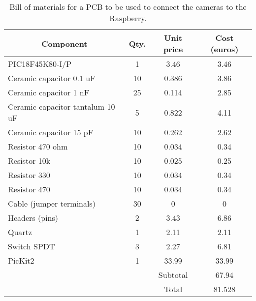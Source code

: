 \begin{table}
\begin{center}
\begin{tabular}{| l | c | c | c |}
\hline
\multicolumn{1}{|c|}{Component}	 & 	\multicolumn{1}{c|}{Qty.}	 & 	\multicolumn{1}{c|}{Unit price} & 	\multicolumn{1}{c|}{Cost (euros)}\\ \hline
PIC18F45K80-I/P	 & 	1	 & 	3.46	 & 	3.46\\ \hline
Ceramic capacitor 0.1 uF	 & 	10	 & 	0.386	 & 	3.86\\ \hline
Ceramic capacitor 1 nF	 & 	25	 & 	0.114	 & 	2.85\\ \hline
Ceramic capacitor tantalum 10 uF	 & 	5	 & 	0.822	 & 	4.11\\ \hline
Ceramic capacitor 15 pF	 & 	10	 & 	0.262	 & 	2.62\\ \hline
Resistor 470 ohm	 & 	10	 & 	0.034	 & 	0.34\\ \hline
Resistor 10k	 & 	10	 & 	0.025	 & 	0.25\\ \hline
Resistor 330	 & 	10	 & 	0.034	 & 	0.34\\ \hline
Resistor 470	 & 	10	 & 	0.034	 & 	0.34\\ \hline
Cable (jumper terminals)	 & 	30	 & 	0	 & 	0\\ \hline
Headers (pins)	 & 	2	 & 	3.43	 & 	6.86\\ \hline
Quartz	 & 	1	 & 	2.11	 & 	2.11\\ \hline
Switch SPDT	 & 	3	 & 	2.27	 & 	6.81\\ \hline
PicKit2	 & 	1	 & 	33.99	 & 	33.99\\ \hline
\multicolumn{2}{c|}{}	 & 	Subtotal	 & 	67.94\\ \cline{3-4}
\multicolumn{2}{c|}{}	& 	Total	 & 	81.528\\ \cline{3-4}
  \end{tabular}
\caption[Bill of materials for a PCB.]{Bill of materials for a PCB to be used to connect the cameras to the Raspberry.}
\label{tab_bompic}
\end{center}
\end{table}
